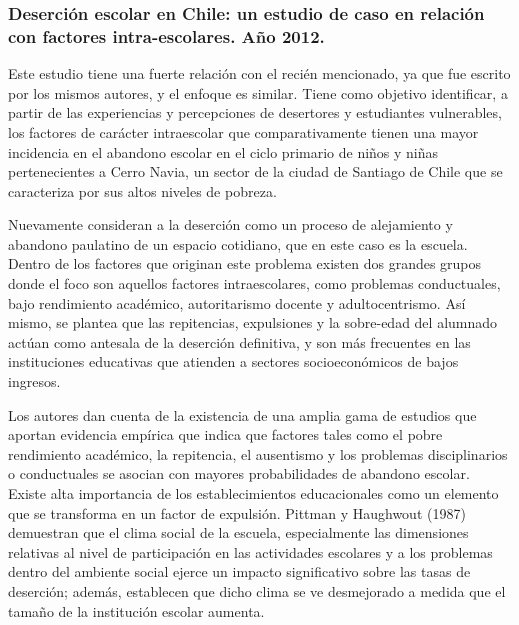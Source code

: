 \subsubsection{Deserción escolar en Chile: un estudio de caso en relación con factores intra-escolares. Año 2012.}
Este estudio tiene una fuerte relación con el recién mencionado, ya que fue escrito por los mismos autores, y el enfoque es similar. Tiene como objetivo identificar, a partir de las experiencias y percepciones de desertores y estudiantes vulnerables, los factores de carácter intraescolar que comparativamente tienen una mayor incidencia en el abandono escolar en el ciclo primario de niños y niñas pertenecientes a Cerro Navia, un sector de la ciudad de Santiago de Chile que se caracteriza por sus altos niveles de pobreza. 

Nuevamente consideran a la deserción como un proceso de alejamiento y abandono paulatino de un espacio cotidiano, que en este caso es la escuela. Dentro de los factores que originan este problema existen dos grandes grupos donde el foco son aquellos factores intraescolares, como problemas conductuales, bajo rendimiento académico, autoritarismo docente y adultocentrismo. Así mismo, se plantea que las repitencias, expulsiones y la sobre-edad del alumnado actúan como antesala de la deserción definitiva, y son más frecuentes en las instituciones educativas que atienden a sectores socioeconómicos de bajos ingresos. 

Los autores dan cuenta de la existencia de una amplia gama de estudios que aportan evidencia empírica que indica que factores tales como el pobre rendimiento académico, la repitencia, el ausentismo y los problemas disciplinarios o conductuales se asocian con mayores probabilidades de abandono escolar. Existe alta importancia de los establecimientos educacionales como un elemento que se transforma en un factor de expulsión. Pittman y Haughwout (1987) demuestran que el clima social de la escuela, especialmente las dimensiones relativas al nivel de participación en las actividades escolares y a los problemas dentro del ambiente social ejerce un impacto significativo sobre las tasas de deserción; además, establecen que dicho clima se ve desmejorado a medida que el tamaño de la institución escolar aumenta. 

